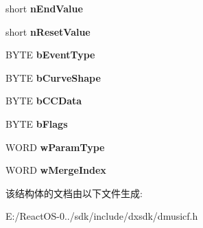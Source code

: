 \begin{DoxyCompactItemize}
short {\bfseries n\+End\+Value}
\item 
\mbox{\label{struct___d_m_u_s___i_o___s_t_y_l_e_c_u_r_v_e_a6149920a5af51db3625d5b1269bb6161}} 
short {\bfseries n\+Reset\+Value}
\item 
\mbox{\label{struct___d_m_u_s___i_o___s_t_y_l_e_c_u_r_v_e_ac76a791c7bd08d2306d518b3bda28bc8}} 
B\+Y\+TE {\bfseries b\+Event\+Type}
\item 
\mbox{\label{struct___d_m_u_s___i_o___s_t_y_l_e_c_u_r_v_e_ab211dd60f22a182b408b92f82ee40d5b}} 
B\+Y\+TE {\bfseries b\+Curve\+Shape}
\item 
\mbox{\label{struct___d_m_u_s___i_o___s_t_y_l_e_c_u_r_v_e_acd7840741689acf8cbfb0762bd967bd6}} 
B\+Y\+TE {\bfseries b\+C\+C\+Data}
\item 
\mbox{\label{struct___d_m_u_s___i_o___s_t_y_l_e_c_u_r_v_e_a28eaa29dad032bb93bdbbb90b6992388}} 
B\+Y\+TE {\bfseries b\+Flags}
\item 
\mbox{\label{struct___d_m_u_s___i_o___s_t_y_l_e_c_u_r_v_e_aeabaf40483f52b8437e8829660f96572}} 
W\+O\+RD {\bfseries w\+Param\+Type}
\item 
\mbox{\label{struct___d_m_u_s___i_o___s_t_y_l_e_c_u_r_v_e_a1eb677a74691afd0ba63405b3696da27}} 
W\+O\+RD {\bfseries w\+Merge\+Index}
\end{DoxyCompactItemize}


该结构体的文档由以下文件生成\+:\begin{DoxyCompactItemize}
\item 
E\+:/\+React\+O\+S-\/0../sdk/include/dxsdk/dmusicf.\+h\end{DoxyCompactItemize}
